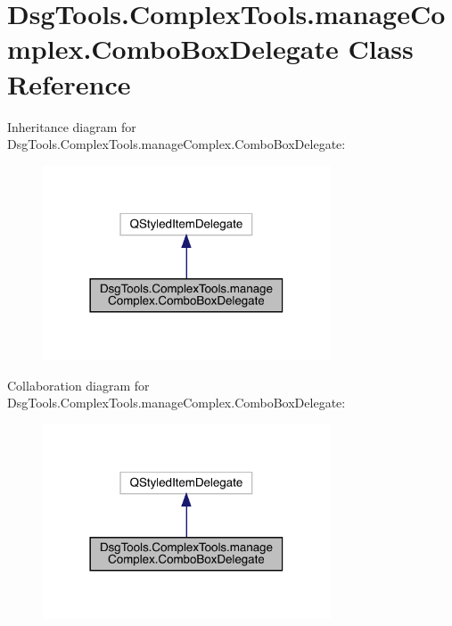 \hypertarget{class_dsg_tools_1_1_complex_tools_1_1manage_complex_1_1_combo_box_delegate}{}\section{Dsg\+Tools.\+Complex\+Tools.\+manage\+Complex.\+Combo\+Box\+Delegate Class Reference}
\label{class_dsg_tools_1_1_complex_tools_1_1manage_complex_1_1_combo_box_delegate}


Inheritance diagram for Dsg\+Tools.\+Complex\+Tools.\+manage\+Complex.\+Combo\+Box\+Delegate\+:
\nopagebreak
\begin{figure}[H]
\begin{center}
\leavevmode
\includegraphics[width=242pt]{class_dsg_tools_1_1_complex_tools_1_1manage_complex_1_1_combo_box_delegate__inherit__graph}
\end{center}
\end{figure}


Collaboration diagram for Dsg\+Tools.\+Complex\+Tools.\+manage\+Complex.\+Combo\+Box\+Delegate\+:
\nopagebreak
\begin{figure}[H]
\begin{center}
\leavevmode
\includegraphics[width=242pt]{class_dsg_tools_1_1_complex_tools_1_1manage_complex_1_1_combo_box_delegate__coll__graph}
\end{center}
\end{figure}
